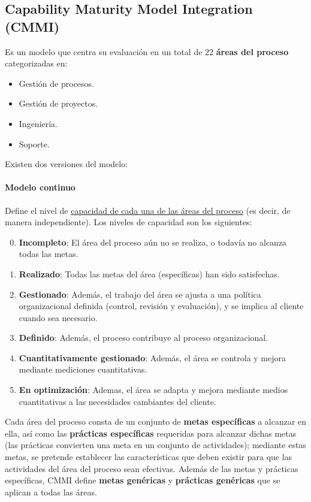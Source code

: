 \subsection{Capability Maturity Model Integration (CMMI)}

Es un modelo que centra su evaluación en un total de 22 \textbf{áreas del proceso} categorizadas en:

\begin{itemize}
    \item Gestión de procesos.
    \item Gestión de proyectos.
    \item Ingeniería.
    \item Soporte.
\end{itemize}

Existen dos versiones del modelo:

\paragraph{Modelo continuo} Define el nivel de \uline{capacidad de cada una de las áreas del proceso} (es decir, de manera independiente). Los niveles de capacidad son los siguientes:
\begin{enumerate}
    \setcounter{enumi}{-1}
    \item \textbf{Incompleto}: El área del proceso aún no se realiza, o todavía no alcanza todas las metas.
    \item \textbf{Realizado}: Todas las metas del área (específicas) han sido satisfechas.
    \item \textbf{Gestionado}: Además, el trabajo del área se ajusta a una política organizacional definida (control, revisión y evaluación), y se implica al cliente cuando sea necesario.
    \item \textbf{Definido}: Además, el proceso contribuye al proceso organizacional.
    \item \textbf{Cuantitativamente gestionado}: Además, el área se controla y mejora mediante mediciones cuantitativas.
    \item \textbf{En optimización}: Ademas, el área se adapta y mejora mediante medios cuantitativas a las necesidades cambiantes del cliente.
\end{enumerate}

Cada área del proceso consta de un conjunto de \textbf{metas específicas} a alcanzar en ella, así como las \textbf{prácticas específicas} requeridas para alcanzar dichas metas (las prácticas convierten una meta en un conjunto de actividades); mediante estas metas, se pretende establecer las características que deben existir para que las actividades del área del proceso sean efectivas. Además de las metas y prácticas específicas, CMMI define \textbf{metas genéricas} y \textbf{prácticas genéricas} que se aplican a todas las áreas.\\

